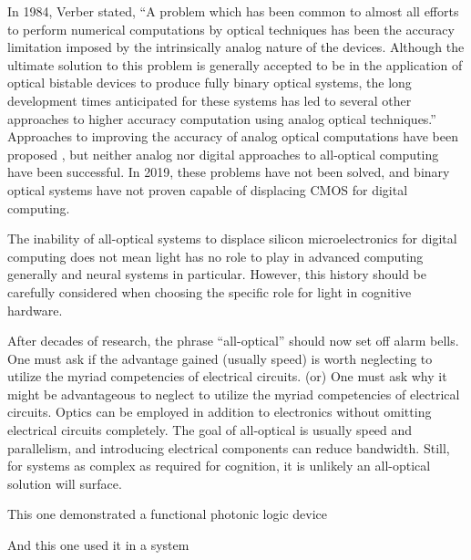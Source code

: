 \cite{ve1984} In 1984, Verber stated, ``A problem which has been common to almost all efforts to perform numerical computations by optical techniques has been the accuracy limitation imposed by the intrinsically analog nature of the devices. Although the ultimate solution to this problem is generally accepted to be in the application of optical bistable devices to produce fully binary optical systems, the long development times anticipated for these systems has led to several other approaches to higher accuracy computation using analog optical techniques.'' Approaches to improving the accuracy of analog optical computations have been proposed \cite{psca1980,arha1984}, but neither analog nor digital approaches to all-optical computing have been successful. In 2019, these problems have not been solved, and binary optical systems have not proven capable of displacing CMOS for digital computing. 

The inability of all-optical systems to displace silicon microelectronics for digital computing does not mean light has no role to play in advanced computing generally and neural systems in particular. However, this history should be carefully considered when choosing the specific role for light in cognitive hardware.

\vspace{3em}
After decades of research, the phrase ``all-optical'' should now set off alarm bells. One must ask if the advantage gained (usually speed) is worth neglecting to utilize the myriad competencies of electrical circuits. (or) One must ask why it might be advantageous to neglect to utilize the myriad competencies of electrical circuits. Optics can be employed in addition to electronics without omitting electrical circuits completely. The goal of all-optical is usually speed and parallelism, and introducing electrical components can reduce bandwidth. Still, for systems as complex as required for cognition, it is unlikely an all-optical solution will surface.

\vspace{3em}
This one demonstrated a functional photonic logic device
\cite{lehi1989}

And this one used it in a system
\cite{mccl1993}

